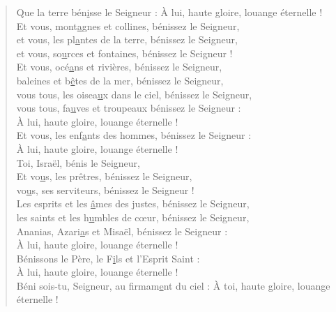 \begin{verse}
Que la terre bén\underline{i}sse le Seigneur :\psalmstar
À lui, haute gloire, louange éternelle !\\

Et vous, mont\underline{a}gnes et collines,\psalmstar
bénissez le Seigneur,\\
et vous, les pl\underline{a}ntes de la terre,\psalmstar
bénissez le Seigneur,\\
et vous, so\underline{u}rces et fontaines,\psalmstar
bénissez le Seigneur !\\

Et vous, océ\underline{a}ns et rivières,\psalmstar
bénissez le Seigneur,\\
baleines et b\underline{ê}tes de la mer,\psalmstar
bénissez le Seigneur,\\
vous tous, les oisea\underline{u}x dans le ciel,\psalmstar
bénissez le Seigneur,\\
vous tous, fa\underline{u}ves et troupeaux\psalmstar
bénissez le Seigneur :\\
À lui, haute gloire, louange éternelle !\\

Et vous, les enf\underline{a}nts des hommes,\psalmstar
bénissez le Seigneur :\\
À lui, haute gloire, louange éternelle !\\

Toi, Israël,\psalmstar
bénis le Seigneur,\\
Et vo\underline{u}s, les prêtres,\psalmstar
bénissez le Seigneur,\\
vo\underline{u}s, ses serviteurs,\psalmstar
bénissez le Seigneur !\\

Les esprits et les \underline{â}mes des justes,\psalmstar
bénissez le Seigneur,\\
les saints et les h\underline{u}mbles de cœur,\psalmstar
bénissez le Seigneur,\\
Ananias, Azari\underline{a}s et Misaël,\psalmstar
bénissez le Seigneur :\\
À lui, haute gloire, louange éternelle !\\

Bénissons le Père, le F\underline{i}ls et l'Esprit Saint :\\
À lui, haute gloire, louange éternelle !\\
Béni sois-tu, Seigneur, au firmam\underline{e}nt du ciel :\psalmstar
À toi, haute gloire, louange éternelle !
\end{verse}

